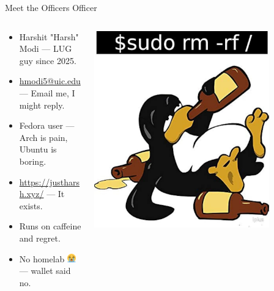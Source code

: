\documentclass{beamer}
\begin{document}
\begin{frame}{Meet the Officers}
	{\Huge Officer}
	\begin{columns}
		\begin{column}{0.5\textwidth}
			\begin{itemize}
				\item {\Large Harshit "Harsh" Modi} — LUG guy since 2025.
				\item {\scriptsize \href{mailto:hmodi5@uic.edu}{hmodi5@uic.edu}} — Email me, I might reply.
				\item {\small Fedora user} — Arch is pain, Ubuntu is boring.
				\item {\small \url{https://justharsh.xyz/}} — It exists.
				\item Runs on caffeine and regret.
				\item No homelab \includegraphics[width=1em]{cry_emoji.png} — wallet said no.
			\end{itemize}
		\end{column}
		\begin{column}{0.5\textwidth}
			\centering
			\includegraphics[width=0.8\textwidth]{drunk_tux.jpg}
		\end{column}
	\end{columns}
\end{frame}
\end{document}
